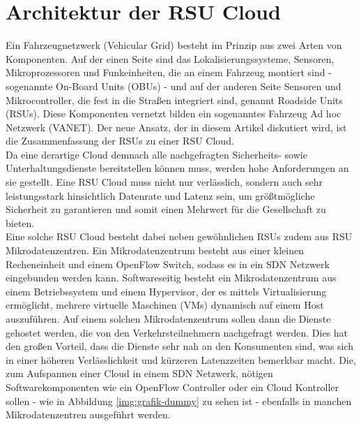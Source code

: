 \documentclass[conference]{IEEEtran}
\begin{document}
\section{Architektur der RSU Cloud}

Ein Fahrzeugnetzwerk (Vehicular Grid) besteht im Prinzip aus zwei Arten von Komponenten. Auf der einen Seite sind das Lokalisierungssysteme, Sensoren, Mikroprozessoren und Funkeinheiten, die an einem Fahrzeug montiert sind - sogenannte On-Board Units (OBUs) - und auf der anderen Seite  Sensoren und Mikrocontroller, die fest in die Straßen integriert sind, genannt Roadside Units (RSUs). Diese Komponenten vernetzt bilden ein sogenanntes Fahrzeug Ad hoc Netzwerk (VANET). Der neue Ansatz, der in diesem Artikel diskutiert wird, ist die Zusammenfassung der RSUs zu einer RSU Cloud.\\
Da eine derartige Cloud demnach alle nachgefragten Sicherheits- sowie Unterhaltungsdienste bereitstellen können muss, werden hohe Anforderungen an sie gestellt. Eine RSU Cloud muss nicht nur verlässlich, sondern auch sehr leistungsstark hinsichtlich Datenrate und Latenz sein, um größtmögliche Sicherheit zu garantieren und somit einen Mehrwert für die Gesellschaft zu bieten.\\
Eine solche RSU Cloud besteht dabei neben gewöhnlichen RSUs zudem aus RSU Mikrodatenzentren. Ein Mikrodatenzentrum besteht aus einer kleinen Recheneinheit und einem OpenFlow Switch, sodass es in ein SDN Netzwerk eingebunden werden kann. Softwareseitig besteht ein Mikrodatenzentrum aus einem Betriebssystem und einem Hypervisor, der es mittels Virtualisierung ermöglicht, mehrere virtuelle Maschinen (VMs) dynamisch auf einem Host auszuführen. Auf einem solchen Mikrodatenzentrum sollen dann die Dienste gehostet werden, die von den Verkehrsteilnehmern nachgefragt werden. Dies hat den großen Vorteil, dass die Dienste sehr \glqq nah\grqq{} an den Konsumenten sind, was sich in einer höheren Verlässlichkeit und kürzeren Latenzzeiten bemerkbar macht. Die, zum Aufspannen einer Cloud in einem SDN Netzwerk, nötigen Softwarekomponenten wie ein OpenFlow Controller oder ein Cloud Kontroller sollen - wie in Abbildung \ref{img:grafik-dummy} zu sehen ist - ebenfalls in manchen Mikrodatenzentren ausgeführt werden.
\end{document}
